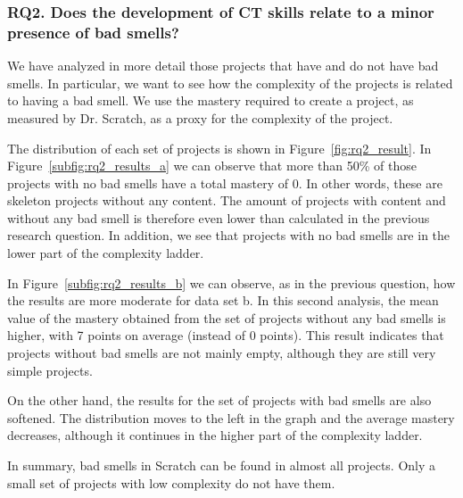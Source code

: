 \subsubsection{RQ2. Does the development of CT skills relate to a minor presence of bad smells?}
\label{subsub:rq2_results}

We have analyzed in more detail those projects that have and do not have bad smells. In particular, we want to see how the complexity of the projects is related to having a bad smell. We use the mastery required to create a project, as measured by Dr. Scratch, as a proxy for the complexity of the project.

The distribution of each set of projects is shown in Figure~\ref{fig:rq2_result}. In Figure~\ref{subfig:rq2_results_a} we can observe that more than 50\% of those projects with no bad smells have a total mastery of 0. In other words, these are skeleton projects without any content. The amount of projects with content and without any bad smell is therefore even lower than calculated in the previous research question. In addition, we see that projects with no bad smells are in the lower part of the complexity ladder.

In Figure~\ref{subfig:rq2_results_b} we can observe, as in the previous question, how the results are more moderate for data set b. In this second analysis, the mean value of the mastery obtained from the set of projects without any bad smells is higher, with 7 points on average (instead of 0 points). This result indicates that projects without bad smells are not mainly empty, although they are still very simple projects.

On the other hand, the results for the set of projects with bad smells are also softened. The distribution moves to the left in the graph and the average mastery decreases, although it continues in the higher part of the complexity ladder.

In summary, bad smells in Scratch can be found in almost all projects. Only a small set of projects with low complexity do not have them.

